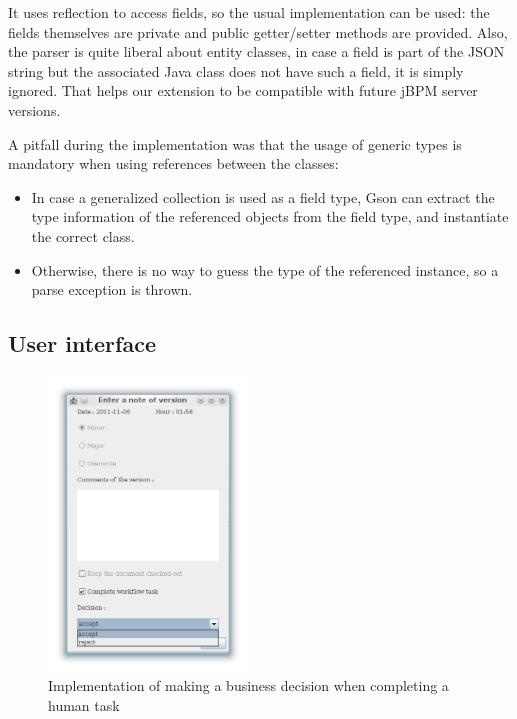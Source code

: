 It uses reflection to access fields, so the usual implementation can
be used: the fields themselves are private and public getter/setter methods are
provided. Also, the parser is quite liberal about entity classes, in case a
field is part of the JSON string but the associated Java class does not have
such a field, it is simply ignored. That helps our extension to be compatible
with future jBPM server versions.

A pitfall during the implementation was that the usage of generic types is
mandatory when using references between the classes:

\begin{itemize}
\item In case a generalized collection is used as a field type, Gson can extract the type information of the referenced objects from the field type, and instantiate the correct class.
\item Otherwise, there is no way to guess the type of the referenced instance, so a parse exception is thrown.
\end{itemize}

\subsection{User interface}

\begin{figure}[H]
\centering
\includegraphics[width=200px,keepaspectratio]{implementation-decision.png}
\caption{Implementation of making a business decision when completing a human task}
\label{fig:implementation-decision}
\end{figure}

